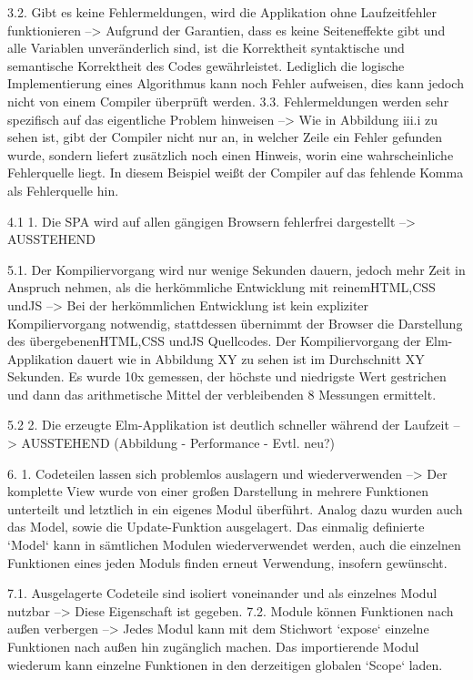  3.2. Gibt es keine Fehlermeldungen, wird die Applikation ohne Laufzeitfehler funktionieren
 --> Aufgrund der Garantien, dass es keine Seiteneffekte gibt und alle Variablen unveränderlich sind, ist die Korrektheit syntaktische und semantische Korrektheit des Codes gewährleistet. Lediglich die logische Implementierung eines Algorithmus kann noch Fehler aufweisen, dies kann jedoch nicht von einem Compiler überprüft werden.
 3.3. Fehlermeldungen werden sehr spezifisch auf das eigentliche Problem hinweisen
 --> Wie in Abbildung iii.i zu sehen ist, gibt der Compiler nicht nur an, in welcher Zeile ein Fehler gefunden wurde, sondern liefert zusätzlich noch einen Hinweis, worin eine wahrscheinliche Fehlerquelle liegt. In diesem Beispiel weißt der Compiler auf das fehlende Komma als Fehlerquelle hin.
 
 4.1  1. Die SPA wird auf allen gängigen Browsern fehlerfrei dargestellt
 --> AUSSTEHEND
 
 5.1. Der Kompiliervorgang wird nur wenige Sekunden dauern, jedoch mehr Zeit in Anspruch nehmen, als die herkömmliche Entwicklung mit reinem\ac{HTML},\ac{CSS} und\ac{JS}
 --> Bei der herkömmlichen Entwicklung ist kein expliziter Kompiliervorgang notwendig, stattdessen übernimmt der Browser die Darstellung des übergebenen\ac{HTML},\ac{CSS} und\ac{JS} Quellcodes. Der Kompiliervorgang der Elm-Applikation dauert wie in Abbildung XY  zu sehen ist im Durchschnitt XY Sekunden. Es wurde 10x gemessen, der höchste und niedrigste Wert gestrichen und dann das arithmetische Mittel der verbleibenden 8 Messungen ermittelt.
 
 5.2  2. Die erzeugte Elm-Applikation ist deutlich schneller während der Laufzeit
 --> AUSSTEHEND (Abbildung - Performance - Evtl. neu?)
 
 6. 1. Codeteilen lassen sich problemlos auslagern und wiederverwenden
 --> Der komplette View wurde von einer großen Darstellung in mehrere Funktionen unterteilt und letztlich in ein eigenes Modul überführt. Analog dazu wurden auch das Model, sowie die Update-Funktion ausgelagert. Das einmalig definierte `Model` kann in sämtlichen Modulen wiederverwendet werden, auch die einzelnen Funktionen eines jeden Moduls finden erneut Verwendung, insofern gewünscht.
 
 7.1. Ausgelagerte Codeteile sind isoliert voneinander und als einzelnes Modul nutzbar
 --> Diese Eigenschaft ist gegeben.
 7.2. Module können Funktionen nach außen verbergen
 --> Jedes Modul kann mit dem Stichwort `expose` einzelne Funktionen nach außen hin zugänglich machen. Das importierende Modul wiederum kann einzelne Funktionen in den derzeitigen globalen `Scope` laden.
 
